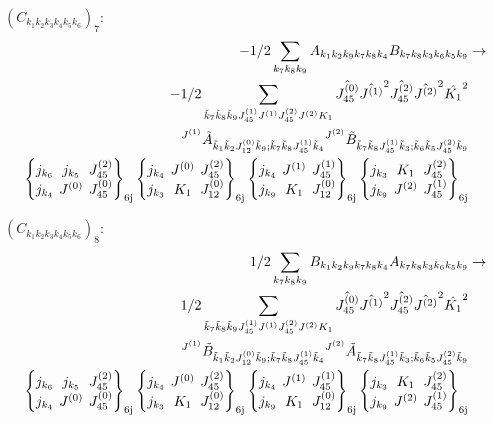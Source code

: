 \documentclass[11pt]{article}
\newcommand{\sixj}[6]{\begingroup\setlength{\arraycolsep}{0.2em}\begin{Bmatrix} #1 & #2 & #3 \\ #4 & #5 & #6 \end{Bmatrix}_{\text{6j}}\endgroup}
\begin{document}
$\left({C}_{{k}_{1}{k}_{2}{k}_{3}{k}_{4}{k}_{5}{k}_{6}}\right)_{7}$:
\begin{align}
-1/2\sum_{{k}_{7}{k}_{8}{k}_{9}}{A}_{{k}_{1}{k}_{2}{k}_{9}{k}_{7}{k}_{8}{k}_{4}}{B}_{{k}_{7}{k}_{8}{k}_{3}{k}_{6}{k}_{5}{k}_{9}}&\rightarrow \notag \\-1/2\sum_{\tilde{k}_{7}\tilde{k}_{8}\tilde{k}_{9}J^{(1)}_{45}J^{(1)}J^{(2)}_{45}J^{(2)}K_{1}}\hat{J^{(0)}_{45}}\hat{J^{(1)}}^{2}\hat{J^{(2)}_{45}}\hat{J^{(2)}}^{2}\hat{K_{1}}^{2}& \notag \\{}^{J^{(1)}}\tilde{A}_{\tilde{k}_{1}\tilde{k}_{2}J^{(0)}_{12}\tilde{k}_{9};\tilde{k}_{7}\tilde{k}_{8}J^{(1)}_{45}\tilde{k}_{4}}{}^{J^{(2)}}\tilde{B}_{\tilde{k}_{7}\tilde{k}_{8}J^{(1)}_{45}\tilde{k}_{3};\tilde{k}_{6}\tilde{k}_{5}J^{(2)}_{45}\tilde{k}_{9}}& \notag \\\sixj{j_{{k}_{6}}}{j_{{k}_{5}}}{J^{(2)}_{45}}{j_{{k}_{4}}}{J^{(0)}}{J^{(0)}_{45}}\sixj{j_{{k}_{4}}}{J^{(0)}}{J^{(2)}_{45}}{j_{{k}_{3}}}{K_{1}}{J^{(0)}_{12}}\sixj{j_{{k}_{4}}}{J^{(1)}}{J^{(1)}_{45}}{j_{{k}_{9}}}{K_{1}}{J^{(0)}_{12}}\sixj{j_{{k}_{3}}}{K_{1}}{J^{(2)}_{45}}{j_{{k}_{9}}}{J^{(2)}}{J^{(1)}_{45}}
\end{align}

$\left({C}_{{k}_{1}{k}_{2}{k}_{3}{k}_{4}{k}_{5}{k}_{6}}\right)_{8}$:
\begin{align}
1/2\sum_{{k}_{7}{k}_{8}{k}_{9}}{B}_{{k}_{1}{k}_{2}{k}_{9}{k}_{7}{k}_{8}{k}_{4}}{A}_{{k}_{7}{k}_{8}{k}_{3}{k}_{6}{k}_{5}{k}_{9}}&\rightarrow \notag \\1/2\sum_{\tilde{k}_{7}\tilde{k}_{8}\tilde{k}_{9}J^{(1)}_{45}J^{(1)}J^{(2)}_{45}J^{(2)}K_{1}}\hat{J^{(0)}_{45}}\hat{J^{(1)}}^{2}\hat{J^{(2)}_{45}}\hat{J^{(2)}}^{2}\hat{K_{1}}^{2}& \notag \\{}^{J^{(1)}}\tilde{B}_{\tilde{k}_{1}\tilde{k}_{2}J^{(0)}_{12}\tilde{k}_{9};\tilde{k}_{7}\tilde{k}_{8}J^{(1)}_{45}\tilde{k}_{4}}{}^{J^{(2)}}\tilde{A}_{\tilde{k}_{7}\tilde{k}_{8}J^{(1)}_{45}\tilde{k}_{3};\tilde{k}_{6}\tilde{k}_{5}J^{(2)}_{45}\tilde{k}_{9}}& \notag \\\sixj{j_{{k}_{6}}}{j_{{k}_{5}}}{J^{(2)}_{45}}{j_{{k}_{4}}}{J^{(0)}}{J^{(0)}_{45}}\sixj{j_{{k}_{4}}}{J^{(0)}}{J^{(2)}_{45}}{j_{{k}_{3}}}{K_{1}}{J^{(0)}_{12}}\sixj{j_{{k}_{4}}}{J^{(1)}}{J^{(1)}_{45}}{j_{{k}_{9}}}{K_{1}}{J^{(0)}_{12}}\sixj{j_{{k}_{3}}}{K_{1}}{J^{(2)}_{45}}{j_{{k}_{9}}}{J^{(2)}}{J^{(1)}_{45}}
\end{align}
\end{document}
